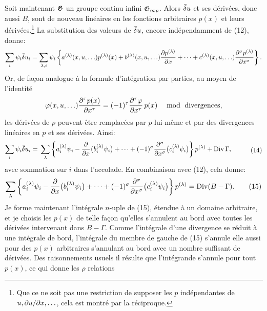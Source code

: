 Soit maintenant \(\mathfrak G\) un groupe continu infini \(\mathfrak G_{\infty\rho}\). Alors \(\bar{\delta} u\) et ses dérivées, donc aussi \(B\), sont de nouveau linéaires en les fonctions arbitraires \(p(x)\) et leurs dérivées.\footnote{Que ce ne soit pas une restriction de supposer les \(p\) indépendantes de \(u,\partial u/\partial x,\ldots\), cela est montré par la réciproque.} La substitution des valeurs de \(\bar{\delta} u\), encore indépendamment de (12), donne:
\[
\sum_i\psi_i\bar{\delta} u_i
=\sum_{\lambda,i}\psi_i\left\{
a^{(\lambda)}(x,u,\ldots)p^{(\lambda)}(x)
+b^{(\lambda)}(x,u,\ldots)\frac{\partial p^{(\lambda)}}{\partial x}
+\cdots+c^{(\lambda)}(x,u,\ldots)
\frac{\partial^\sigma p^{(\lambda)}}{\partial x^\sigma}\right\}.
\]
Or, de façon analogue à la formule d'intégration par parties, au moyen de l'identité
\[
\varphi(x,u,\ldots)\frac{\partial^\tau p(x)}{\partial x^\tau}
=(-1)^\tau\frac{\partial^\tau\varphi}{\partial x^\tau}\,p(x)
\quad \bmod \text{ divergences},
\]
les dérivées de \(p\) peuvent être remplacées par \(p\) lui-même et par des divergences linéaires en \(p\) et ses dérivées. Ainsi:
\begin{equation}
\begin{aligned}
\sum_i\psi_i\bar{\delta} u_i
={}&\sum_\lambda\left\{
a_i^{(\lambda)}\psi_i-\frac{\partial}{\partial x}\bigl(b_i^{(\lambda)}\psi_i\bigr)
+\cdots+(-1)^\sigma
\frac{\partial^\sigma}{\partial x^\sigma}\bigl(c_i^{(\lambda)}\psi_i\bigr)
\right\}p^{(\lambda)}+\operatorname{Div}\Gamma,
\end{aligned}
\tag{14}
\end{equation}
avec sommation sur \(i\) dans l'accolade. En combinaison avec (12), cela donne:
\begin{equation}
\sum_\lambda\left\{
a_i^{(\lambda)}\psi_i-\frac{\partial}{\partial x}\bigl(b_i^{(\lambda)}\psi_i\bigr)
+\cdots+(-1)^\sigma
\frac{\partial^\sigma}{\partial x^\sigma}\bigl(c_i^{(\lambda)}\psi_i\bigr)
\right\}p^{(\lambda)}
=\operatorname{Div}(B-\Gamma).
\tag{15}
\end{equation}
Je forme maintenant l'intégrale \(n\)-uple de (15), étendue à un domaine arbitraire, et je choisis les \(p(x)\) de telle façon qu'elles s'annulent au bord avec toutes les dérivées intervenant dans \(B-\Gamma\). Comme l'intégrale d'une divergence se réduit à une intégrale de bord, l'intégrale du membre de gauche de (15) s'annule elle aussi pour des \(p(x)\) arbitraires s'annulant au bord avec un nombre suffisant de dérivées. Des raisonnements usuels il résulte que l'intégrande s'annule pour tout \(p(x)\), ce qui donne les \(\rho\) relations
